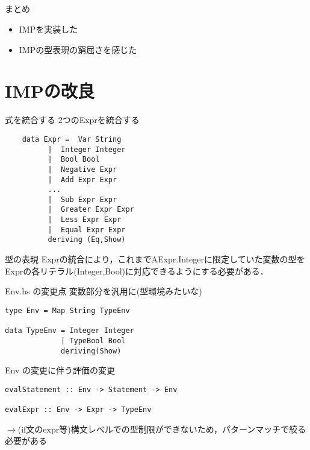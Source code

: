 \documentclass[uplatex,dvipdfmx,ja=standard]{beamer}
\begin{document}
\subsection{}

\begin{frame}{まとめ}
    \begin{itemize}
        \item \large IMPを実装した
        \item \large IMPの型表現の窮屈さを感じた
    \end{itemize}
\end{frame}

\section{IMPの改良}

\begin{frame}[fragile]{式を統合する}
    2つのExprを統合する
    \begin{verbatim}
    data Expr =  Var String   
          |  Integer Integer 
          |  Bool Bool
          |  Negative Expr
          |  Add Expr Expr
          ...
          |  Sub Expr Expr
          |  Greater Expr Expr
          |  Less Expr Expr
          |  Equal Expr Expr
          deriving (Eq,Show)
    \end{verbatim}

\end{frame}

\begin{frame}[fragile]{型の表現}
    Exprの統合により，これまでAExpr.Integerに限定していた変数の型をExprの各リテラル(Integer,Bool)に対応できるようにする必要がある．

\end{frame}

\begin{frame}[fragile]{Env.hs の変更点}
    変数部分を汎用に(型環境みたいな)
    \begin{verbatim}
type Env = Map String TypeEnv  

data TypeEnv = Integer Integer 
             | TypeBool Bool
             deriving(Show)
    \end{verbatim}
\end{frame}

\begin{frame}[fragile]{Env の変更に伴う評価の変更}
    
    \begin{verbatim}
evalStatement :: Env -> Statement -> Env 

evalExpr :: Env -> Expr -> TypeEnv
    \end{verbatim}

    $\to$(if文のexpr等)構文レベルでの型制限ができないため，パターンマッチで絞る必要がある
\end{frame}
\end{document}
